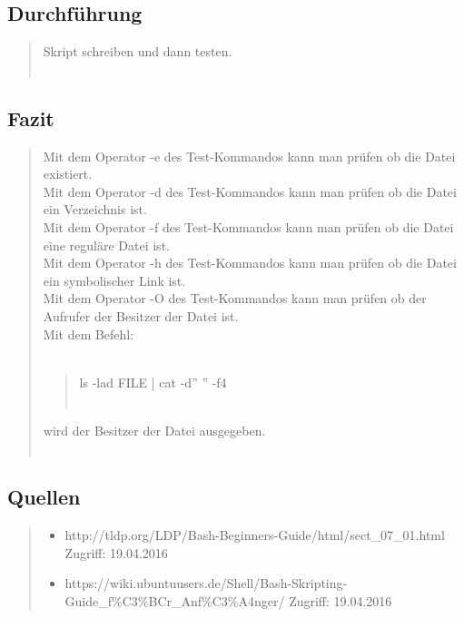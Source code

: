 	\subsection{Durchführung}
		\begin{quote}
			 Skript schreiben und dann testen.\\ \\
		\end{quote}
	\subsection{Fazit}
		\begin{quote}
			Mit dem Operator -e des Test-Kommandos kann man pr\"ufen ob die Datei existiert.\\
			Mit dem Operator -d des Test-Kommandos kann man pr\"ufen ob die Datei ein Verzeichnis ist.\\
			Mit dem Operator -f des Test-Kommandos kann man pr\"ufen ob die Datei eine regul\"are Datei ist.\\
			Mit dem Operator -h des Test-Kommandos kann man pr\"ufen ob die Datei ein symbolischer Link ist.\\
			Mit dem Operator -O des Test-Kommandos kann man pr\"ufen ob der Aufrufer der Besitzer der Datei ist.\\
			Mit dem Befehl: \\ \\
			\begin{quote}
				ls -lad FILE | cat -d'' '' -f4\\ \\
			\end{quote}
			wird der Besitzer der Datei ausgegeben.\\ \\
		\end{quote}
	\subsection{Quellen}
		\begin{quote}
			\begin{itemize}
				\item http://tldp.org/LDP/Bash-Beginners-Guide/html/sect\_07\_01.html Zugriff: 19.04.2016\\
				\item https://wiki.ubuntuusers.de/Shell/Bash-Skripting-Guide\_f\%C3\%BCr\_Anf\%C3\%A4nger/ Zugriff: 19.04.2016\\
			\end{itemize}
		\end{quote}
\newpage
